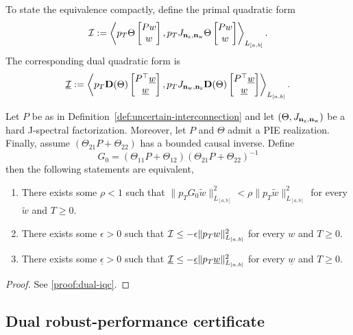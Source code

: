 To state the equivalence compactly, define the primal quadratic form
\[\mathcal{I} := \left\langle p_T \Theta\begin{bmatrix}Pw \\ w\end{bmatrix}, p_T J_{\mathbf{n}_{{\mathrm{z}}}, \mathbf{n}_{{\mathrm{w}}}}\Theta\begin{bmatrix}Pw \\ w\end{bmatrix} \right\rangle_{L_{[a,b]}} .\]
The corresponding dual quadratic form is
\[\underline{\mathcal{I}} := \left\langle p_T \mathbf{D}(\Theta)\begin{bmatrix}P^\top\underline{w} \\ \underline{w}\end{bmatrix}, p_T J_{\mathbf{n}_{{\mathrm{w}}}, \mathbf{n}_{{\mathrm{z}}}}\mathbf{D}(\Theta)\begin{bmatrix}P^\top\underline{w} \\ \underline{w}\end{bmatrix} \right\rangle_{L_{[a,b]}} .\]


\begin{theorem}\label{thm:dual-iqc}
Let $P$ be as in Definition~\ref{def:uncertain-interconnection} and let $\left(\Theta, J_{\mathbf{n}_{{\mathrm{z}}},\mathbf{n}_{{\mathrm{w}}}}\right)$ be a hard J-spectral factorization.
Moreover, let $P$ and $\Theta$ admit a PIE realization.
    Finally, assume $(\Theta_{21}P +\Theta_{22})$ has a bounded causal inverse. 
    Define 
    \begin{equation*}
        G_0 = (\Theta_{11}P +\Theta_{12})(\Theta_{21}P+\Theta_{22})^{-1}
    \end{equation*} 
    then the following statements are equivalent,
    \begin{enumerate}
        \item There exists some $\rho<1$ such that $\|p_T G_0 \tilde{w}\|^2_{L_{[a,b]}}<\rho\|p_T \tilde{w}\|^2_{L_{[a,b]}}$ for every $\tilde{w}$ and $T\geq 0 $.
        \item There exists some $\epsilon > 0$ such that $\mathcal{I}\leq - \epsilon \|p_T w\|_{L_{[a,b]}}^2$ for every $w$ and $T\geq0$.
        \item There exists some $\underline{\epsilon}>0$ such that $\underline{\mathcal{I}} \leq - \underline{\epsilon}\|p_T\underline{w}\|_{L_{[a,b]}}^2$ for every $\underline w$ and $T\geq0$.
    \end{enumerate}
\end{theorem}
\begin{proof}
    See \ref{proof:dual-iqc}.
\end{proof}
\subsection{Dual robust-performance certificate}

